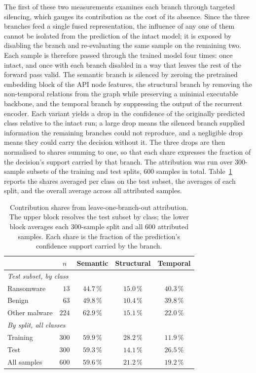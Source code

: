 \documentclass[%
    BCOR=10mm,
    DIV=13,
    toc=bibliography,
    toc=listof,
    oneside,
    12pt,
]{scrbook}
\begin{document}
The first of these two measurements examines each branch through targeted
silencing, which gauges its contribution as the cost of its
absence. Since the three branches feed a single fused representation, the
influence of any one of them cannot be isolated from the prediction of the
intact model; it is exposed by disabling the branch and re-evaluating the same
sample on the remaining two. Each sample is therefore passed through the
trained model four times: once intact, and once with each branch disabled in a
way that leaves the rest of the forward pass valid. The
semantic branch is silenced by zeroing the pretrained embedding block of the
API node features, the structural branch by removing the non-temporal relations
from the graph while preserving a minimal executable backbone, and the temporal
branch by suppressing the output of the recurrent encoder. Each variant yields
a drop in the confidence of the originally predicted class relative to the
intact run; a large drop means the silenced branch supplied information the
remaining branches could not reproduce, and a negligible drop means they could
carry the decision without it. The three drops are then normalised to shares summing to
one, so that each share expresses the fraction of the decision's support
carried by that branch. The attribution was run over $300$-sample subsets of
the training and test splits, $600$ samples in total.
Table~\ref{tab:branch_contributions} reports the shares averaged per class on
the test subset, the averages of each split, and the overall average across all
attributed samples.

\begin{table}[htbp]
\centering
\caption[Branch contribution shares]{Contribution shares from leave-one-branch-out attribution. The upper
block resolves the test subset by class; the lower block averages each
$300$-sample split and all $600$ attributed samples. Each share is the fraction
of the prediction's confidence support carried by the branch.}
\label{tab:branch_contributions}
\begin{tabular}{l r ccc}
\toprule
 & \multicolumn{1}{c}{$n$} & \textbf{Semantic} & \textbf{Structural} & \textbf{Temporal} \\
\midrule
\multicolumn{5}{l}{\textit{Test subset, by class}} \\
Ransomware    & $13$  & $44.7\,\%$ & $15.0\,\%$ & $40.3\,\%$ \\
Benign        & $63$  & $49.8\,\%$ & $10.4\,\%$ & $39.8\,\%$ \\
Other malware & $224$ & $62.9\,\%$ & $15.1\,\%$ & $22.0\,\%$ \\
\midrule
\multicolumn{5}{l}{\textit{By split, all classes}} \\
Training      & $300$ & $59.9\,\%$ & $28.2\,\%$ & $11.9\,\%$ \\
Test          & $300$ & $59.3\,\%$ & $14.1\,\%$ & $26.5\,\%$ \\
\midrule
All samples   & $600$ & $59.6\,\%$ & $21.2\,\%$ & $19.2\,\%$ \\
\bottomrule
\end{tabular}
\end{table}
\end{document}
